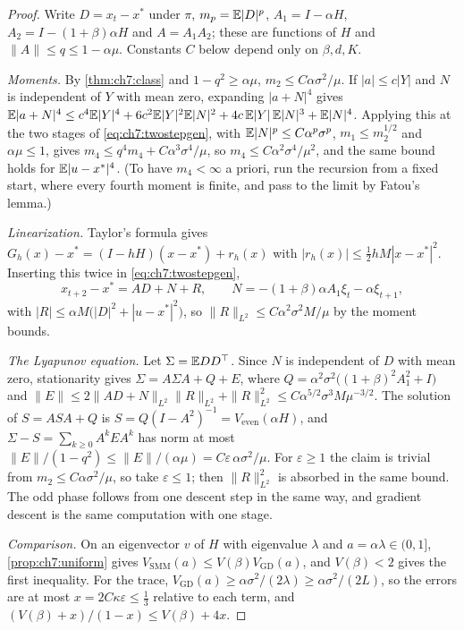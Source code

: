 \begin{proof}
Write $D=x_t-x^\ast$ under $\pi$, $m_p=\mathbb{E}|D|^p$, $A_1=I-\alpha H$, $A_2=I-(1+\beta)\alpha H$ and $A=A_1A_2$; these are functions of $H$ and $\|A\|\le q\le1-\alpha\mu$. Constants $C$ below depend only on $\beta,d,K$.

\emph{Moments.} By \cref{thm:ch7:class} and $1-q^2\ge\alpha\mu$, $m_2\le C\alpha\sigma^2/\mu$. If $|a|\le c|Y|$ and $N$ is independent of $Y$ with mean zero, expanding $|a+N|^4$ gives $\mathbb{E}|a+N|^4\le c^4\mathbb{E}|Y|^4+6c^2\mathbb{E}|Y|^2\mathbb{E}|N|^2+4c\,\mathbb{E}|Y|\,\mathbb{E}|N|^3+\mathbb{E}|N|^4$. Applying this at the two stages of \eqref{eq:ch7:twostepgen}, with $\mathbb{E}|N|^p\le C\alpha^p\sigma^p$, $m_1\le m_2^{1/2}$ and $\alpha\mu\le1$, gives $m_4\le q^4m_4+C\alpha^3\sigma^4/\mu$, so $m_4\le C\alpha^2\sigma^4/\mu^2$, and the same bound holds for $\mathbb{E}|u-x^\ast|^4$. (To have $m_4<\infty$ a priori, run the recursion from a fixed start, where every fourth moment is finite, and pass to the limit by Fatou's lemma.)

\emph{Linearization.} Taylor's formula gives $G_h(x)-x^\ast=(I-hH)(x-x^\ast)+r_h(x)$ with $|r_h(x)|\le\tfrac12hM|x-x^\ast|^2$. Inserting this twice in \eqref{eq:ch7:twostepgen},
\[
  x_{t+2}-x^\ast=AD+N+R,\qquad N=-(1+\beta)\alpha A_1\xi_t-\alpha\xi_{t+1},
\]
with $|R|\le\alpha M\bigl(|D|^2+|u-x^\ast|^2\bigr)$, so $\|R\|_{L^2}\le C\alpha^2\sigma^2M/\mu$ by the moment bounds.

\emph{The Lyapunov equation.} Let $\Sigma=\mathbb{E} DD^\top$. Since $N$ is independent of $D$ with mean zero, stationarity gives $\Sigma=A\Sigma A+Q+E$, where $Q=\alpha^2\sigma^2\bigl((1+\beta)^2A_1^2+I\bigr)$ and $\|E\|\le2\|AD+N\|_{L^2}\|R\|_{L^2}+\|R\|_{L^2}^2\le C\alpha^{5/2}\sigma^3M\mu^{-3/2}$. The solution of $S=ASA+Q$ is $S=Q(I-A^2)^{-1}=V_{\mathrm{even}}(\alpha H)$, and $\Sigma-S=\sum_{k\ge0}A^kEA^k$ has norm at most $\|E\|/(1-q^2)\le\|E\|/(\alpha\mu)=C\varepsilon\,\alpha\sigma^2/\mu$. For $\varepsilon\ge1$ the claim is trivial from $m_2\le C\alpha\sigma^2/\mu$, so take $\varepsilon\le1$; then $\|R\|_{L^2}^2$ is absorbed in the same bound. The odd phase follows from one descent step in the same way, and gradient descent is the same computation with one stage.

\emph{Comparison.} On an eigenvector $v$ of $H$ with eigenvalue $\lambda$ and $a=\alpha\lambda\in(0,1]$, \cref{prop:ch7:uniform} gives $V_{\mathrm{SMM}}(a)\le V(\beta)V_{\mathrm{GD}}(a)$, and $V(\beta)<2$ gives the first inequality. For the trace, $V_{\mathrm{GD}}(a)\ge\alpha\sigma^2/(2\lambda)\ge\alpha\sigma^2/(2L)$, so the errors are at most $x=2C\kappa\varepsilon\le\tfrac13$ relative to each term, and $(V(\beta)+x)/(1-x)\le V(\beta)+4x$.
\end{proof}


